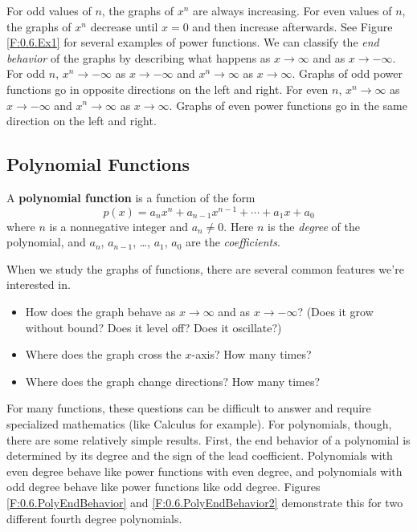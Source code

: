 For odd values of $n$, the graphs of $x^{n}$ are always increasing.  For even values of
$n$, the graphs of $x^{n}$ decrease until $x=0$ and then increase afterwards. See Figure
\ref{F:0.6.Ex1} for several examples of power functions. We can classify the {\it end
behavior} of the graphs by describing what happens as $x\to\infty$ and as $x\to-\infty$.
For odd $n$, $x^{n}\to -\infty$ as $x\to-\infty$ and $x^{n}\to\infty$ as $x\to\infty$.
Graphs of odd power functions go in opposite directions on the left and right.  For even
$n$, $x^{n}\to \infty$ as $x\to-\infty$ and $x^{n}\to\infty$ as $x\to\infty$.  Graphs of
even power functions go in the same direction on the left and right.



\subsection*{Polynomial Functions} 

\begin{definition}
A {\bf polynomial function} is a function of the form
	\[
		p(x)=a_{n}x^{n} + a_{n-1}x^{n-1}+\cdots + a_{1}x + a_{0}
	\]
where $n$ is a nonnegative integer and $a_{n}\ne 0$.  Here $n$ is the {\it degree} of the
polynomial, and $a_{n}$, $a_{n-1}$, \ldots, $a_{1}$, $a_{0}$ are the {\it coefficients}.
\end{definition}

When we study the graphs of functions, there are several common features we're interested in.  
\begin{itemize}
	\item How does the graph behave as $x\to\infty$ and as $x\to-\infty$? (Does it grow without bound? Does it level off? Does it oscillate?) 
	\item Where does the graph cross the $x$-axis? How many times? 
	\item Where does the graph change directions? How many times?
\end{itemize}

For many functions, these questions can be difficult to answer and require specialized
mathematics (like Calculus for example).  For polynomials, though, there are some
relatively simple results.  First, the end behavior of a polynomial is determined by its
degree and the sign of the lead coefficient.  Polynomials with even degree behave like
power functions with even degree, and polynomials with odd degree behave like power
functions like odd degree. Figures \ref{F:0.6.PolyEndBehavior} and
\ref{F:0.6.PolyEndBehavior2} demonstrate this for two different fourth degree polynomials.

